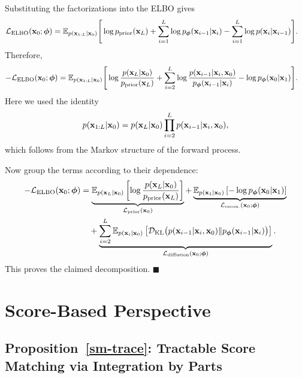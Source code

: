 Substituting the factorizations into the ELBO gives
\begin{align*}
\mathcal{L}_{\text{ELBO}}({\mathbf{x}}_0;\bm{\phi})
&=
\mathbb{E}_{p({\mathbf{x}}_{1:L}| {\mathbf{x}}_0)}
\Bigg[
\log p_{\text{prior}}({\mathbf{x}}_L)
+
\sum_{i=1}^L \log p_{\bm{\phi}}({\mathbf{x}}_{i-1}| {\mathbf{x}}_i)
-
\sum_{i=1}^L \log p({\mathbf{x}}_i| {\mathbf{x}}_{i-1})
\Bigg].
\end{align*}
Therefore,
\begin{align*}
-\mathcal{L}_{\text{ELBO}}({\mathbf{x}}_0;\bm{\phi})
&=
\mathbb{E}_{p({\mathbf{x}}_{1:L}| {\mathbf{x}}_0)}
\Bigg[
\log \frac{p({\mathbf{x}}_L| {\mathbf{x}}_0)}{p_{\text{prior}}({\mathbf{x}}_L)}
+
\sum_{i=2}^L
\log \frac{p({\mathbf{x}}_{i-1}| {\mathbf{x}}_i,{\mathbf{x}}_0)}{p_{\bm{\phi}}({\mathbf{x}}_{i-1}| {\mathbf{x}}_i)}
-
\log p_{\bm{\phi}}({\mathbf{x}}_0| {\mathbf{x}}_1)
\Bigg].
\end{align*}
Here we used the identity
\[
p({\mathbf{x}}_{1:L}| {\mathbf{x}}_0)
=
p({\mathbf{x}}_L| {\mathbf{x}}_0)\prod_{i=2}^L p({\mathbf{x}}_{i-1}| {\mathbf{x}}_i,{\mathbf{x}}_0),
\]
which follows from the Markov structure of the forward process.

Now group the terms according to their dependence:
\begin{align*}
-\mathcal{L}_{\text{ELBO}}({\mathbf{x}}_0;\bm{\phi})
&=
\underbrace{
\mathbb{E}_{p({\mathbf{x}}_L| {\mathbf{x}}_0)}
\left[
\log \frac{p({\mathbf{x}}_L| {\mathbf{x}}_0)}{p_{\text{prior}}({\mathbf{x}}_L)}
\right]
}_{\mathcal{L}_{\text{prior}}({\mathbf{x}}_0)}
+
\underbrace{
\mathbb{E}_{p({\mathbf{x}}_1| {\mathbf{x}}_0)}
\left[
-\log p_{\bm{\phi}}({\mathbf{x}}_0| {\mathbf{x}}_1)
\right]
}_{\mathcal{L}_{\text{recon.}}({\mathbf{x}}_0;\bm{\phi})}
\\
&\quad+
\underbrace{
\sum_{i=2}^L
\mathbb{E}_{p({\mathbf{x}}_i| {\mathbf{x}}_0)}
\left[
\mathcal{D}_{\mathrm{KL}}
\big(
p({\mathbf{x}}_{i-1}| {\mathbf{x}}_i,{\mathbf{x}}_0)
\|
p_{\bm{\phi}}({\mathbf{x}}_{i-1}| {\mathbf{x}}_i)
\big)
\right]
}_{\mathcal{L}_{\text{diffusion}}({\mathbf{x}}_0;\bm{\phi})}.
\end{align*}
This proves the claimed decomposition. 
\hfill$\blacksquare$


\clearpage
\newpage

\section{Score-Based Perspective}\label{app-sec:score-proof}

\subsection{Proposition~\ref{sm-trace}: Tractable Score Matching via Integration by Parts}\label{app-sec:sm-trace}
